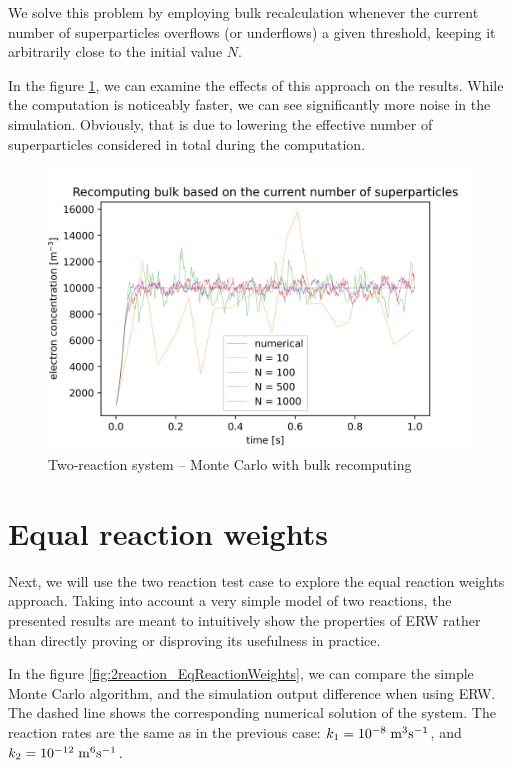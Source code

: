 We solve this problem by employing bulk recalculation whenever the current number of superparticles overflows (or underflows) a given threshold, keeping it arbitrarily close to the initial value $N$.

In the figure \ref{fig:2recRecomputingN}, we can examine the effects of this approach on the results. While the computation is noticeably faster, we can see significantly more noise in the simulation. Obviously, that is due to lowering the effective number of superparticles considered in total during the computation.

\begin{figure} 
    \centering
    \includegraphics[width=\textwidth]{grafy/2reaction_recomputingN.png}
    \caption{Two-reaction system -- Monte Carlo with bulk recomputing}
    \label{fig:2recRecomputingN}
\end{figure}

\section{Equal reaction weights}

Next, we will use the two reaction test case to explore the equal reaction weights approach. Taking into account a very simple model of two reactions, the presented results are meant to intuitively show the properties of ERW rather than directly proving or disproving its usefulness in practice.

In the figure \ref{fig:2reaction_EqReactionWeights}, we can compare the simple Monte Carlo algorithm, and the simulation output difference when using ERW. The dashed line shows the corresponding numerical solution of the system. The reaction rates are the same as in the previous case: $k_1 = 10^{-8} \;\rm m^{3} \rm s^{-1}$, and $k_2 = 10^{-12} \;\rm m^{6} \rm s^{-1}$. 

